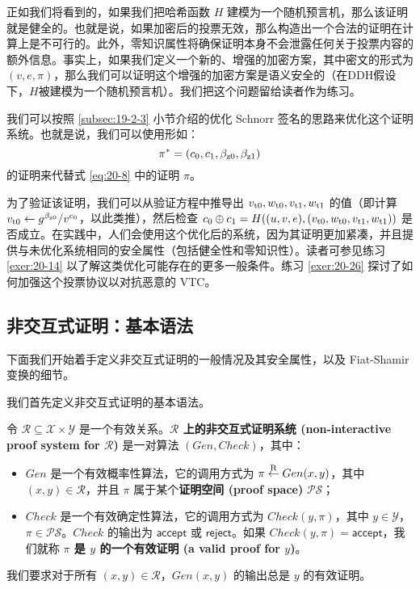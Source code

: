 正如我们将看到的，如果我们把哈希函数 $H$ 建模为一个随机预言机，那么该证明就是健全的。也就是说，如果加密后的投票无效，那么构造出一个合法的证明在计算上是不可行的。此外，零知识属性将确保证明本身不会泄露任何关于投票内容的额外信息。事实上，如果我们定义一个新的、增强的加密方案，其中密文的形式为 $(v,e,\pi)$，那么我们可以证明这个增强的加密方案是语义安全的（在DDH假设下，$H$被建模为一个随机预言机）。我们把这个问题留给读者作为练习。

我们可以按照 \ref{subsec:19-2-3} 小节介绍的优化 Schnorr 签名的思路来优化这个证明系统。也就是说，我们可以使用形如：
\[
\pi^*=(c_0,c_1,\beta_{\rm z0},\beta_{\rm z1})
\]
的证明来代替式 \ref{eq:20-8} 中的证明 $\pi$。

为了验证该证明，我们可以从验证方程中推导出 $v_{\rm t0},w_{\rm t0},v_{\rm t1},w_{\rm t1}$ 的值（即计算 $v_{\rm t0}\leftarrow{g^{\beta_{\rm z0}}}/{v^{c_0}}$，以此类推），然后检查 $c_0\oplus c_1=H((u,v,e),(v_{\rm t0},w_{\rm t0},v_{\rm t1},w_{\rm t1}))$ 是否成立。在实践中，人们会使用这个优化后的系统，因为其证明更加紧凑，并且提供与未优化系统相同的安全属性（包括健全性和零知识性）。读者可参见练习 \ref{exer:20-14} 以了解这类优化可能存在的更多一般条件。练习 \ref{exer:20-26} 探讨了如何加强这个投票协议以对抗恶意的 VTC。

\subsection{非交互式证明：基本语法}

下面我们开始着手定义非交互式证明的一般情况及其安全属性，以及 Fiat-Shamir 变换的细节。

我们首先定义非交互式证明的基本语法。

\begin{definition}[非交互式证明系统]
令 $\mathcal{R}\subseteq\mathcal{X}\times\mathcal{Y}$ 是一个有效关系。\textbf{$\mathcal R$ 上的非交互式证明系统 (non-interactive proof system for $\mathcal{R}$)} 是一对算法 $(Gen,Check)$，其中：
\begin{itemize}
	\item $Gen$ 是一个有效概率性算法，它的调用方式为 $\pi\overset{\rm R}\leftarrow Gen(x,y)$，其中 $(x, y)\in\mathcal{R}$，并且 $\pi$ 属于某个\textbf{证明空间 (proof space)} $\mathcal{PS}$；
	\item $Check$ 是一个有效确定性算法，它的调用方式为 $Check(y,\pi)$，其中 $y\in\mathcal{Y}$，$\pi\in\mathcal{PS}$。$Check$ 的输出为 $\mathsf{accept}$ 或 $\mathsf{reject}$。如果 $Check(y,\pi)=\mathsf{accept}$，我们就称 \textbf{$\pi$ 是 $y$ 的一个有效证明 (a valid proof for $y$)}。
\end{itemize}
我们要求对于所有 $(x, y)\in\mathcal{R}$，$Gen(x,y)$ 的输出总是 $y$ 的有效证明。
\end{definition}


